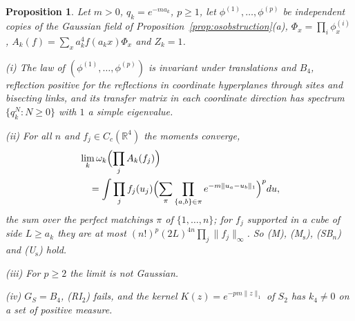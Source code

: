 \documentclass[aps,prd,twocolumn,superscriptaddress,nofootinbib,longbibliography,floatfix,amsmath,amssymb,10pt]{revtex4-2}
\newtheorem{proposition}[theorem]{Proposition}
\theoremstyle{definition}
\theoremstyle{remark}
\newcommand{\R}{\mathbb{R}}
\begin{document}
\begin{proposition}\label{prop:limitEproduct}
Let $m>0$, $q_k=e^{-ma_k}$, $p\ge1$, let $\phi^{(1)},\dots,\phi^{(p)}$ be
independent copies of the Gaussian field of
Proposition~\textup{\ref{prop:osobstruction}(a)}, $\Phi_x=\prod_i
\phi^{(i)}_x$, $A_k(f)=\sum_xa_k^4f(a_kx)\Phi_x$ and $Z_k=1$.

\textup{(i)} The law of $(\phi^{(1)},\dots,\phi^{(p)})$ is invariant under
translations and $B_4$, reflection positive for the reflections in
coordinate hyperplanes through sites and bisecting links, and its transfer
matrix in each coordinate direction has spectrum $\{q_k^N:N\ge0\}$ with $1$
a simple eigenvalue.

\textup{(ii)} For all $n$ and $f_j\in C_c(\R^4)$ the moments converge,
\[
\begin{split}
&\lim_k\omega_k\Bigl(\prod_jA_k(f_j)\Bigr)\\
&\quad=\int\prod_jf_j(u_j)\Bigl(\sum_\pi\prod_{\{a,b\}\in\pi}
e^{-m\|u_a-u_b\|_1}\Bigr)^pdu,
\end{split}
\]
the sum over the perfect matchings $\pi$ of $\{1,\dots,n\}$; for $f_j$
supported in a cube of side $L\ge a_k$ they are at most
$(n!)^p(2L)^{4n}\prod_j\|f_j\|_\infty$. So \textup{(M)},
\textup{(M$_{\mathrm s}$)}, \textup{(SB$_n$)} and \textup{(U$_{\mathrm
s}$)} hold.

\textup{(iii)} For $p\ge2$ the limit is not Gaussian.

\textup{(iv)} $G_S=B_4$, \textup{(RI$_2$)} fails, and the kernel
$K(z)=e^{-pm\|z\|_1}$ of $S_2$ has $k_4\ne0$ on a set of positive measure.
\end{proposition}
\end{document}
